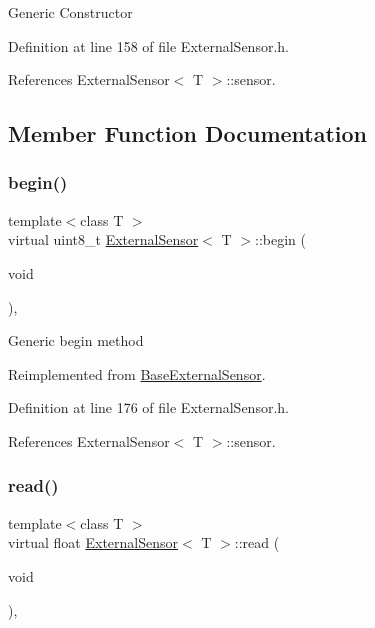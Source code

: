 Generic Constructor 

Definition at line 158 of file External\+Sensor.\+h.



References External\+Sensor$<$ T $>$\+::sensor.



\subsection{Member Function Documentation}
\mbox{\label{class_external_sensor_ab6fe1379d55b656a048e0fba1e0a32e6}} 
\subsubsection{\texorpdfstring{begin()}{begin()}}
{\footnotesize\ttfamily template$<$class T $>$ \\
virtual uint8\+\_\+t \hyperlink{class_external_sensor}{External\+Sensor}$<$ T $>$\+::begin (\begin{DoxyParamCaption}\item[{void}]{ }\end{DoxyParamCaption})\hspace{0.3cm}{\ttfamily [inline]}, {\ttfamily [virtual]}}

Generic begin method 

Reimplemented from \hyperlink{class_base_external_sensor_a87d132803d4f4fdd4e66332809f0c9a0}{Base\+External\+Sensor}.



Definition at line 176 of file External\+Sensor.\+h.



References External\+Sensor$<$ T $>$\+::sensor.

\mbox{\label{class_external_sensor_a5fb3afc7d244fb86dac68ab5481bc407}} 
\subsubsection{\texorpdfstring{read()}{read()}}
{\footnotesize\ttfamily template$<$class T $>$ \\
virtual float \hyperlink{class_external_sensor}{External\+Sensor}$<$ T $>$\+::read (\begin{DoxyParamCaption}\item[{void}]{ }\end{DoxyParamCaption})\hspace{0.3cm}{\ttfamily [inline]}, {\ttfamily [virtual]}}

